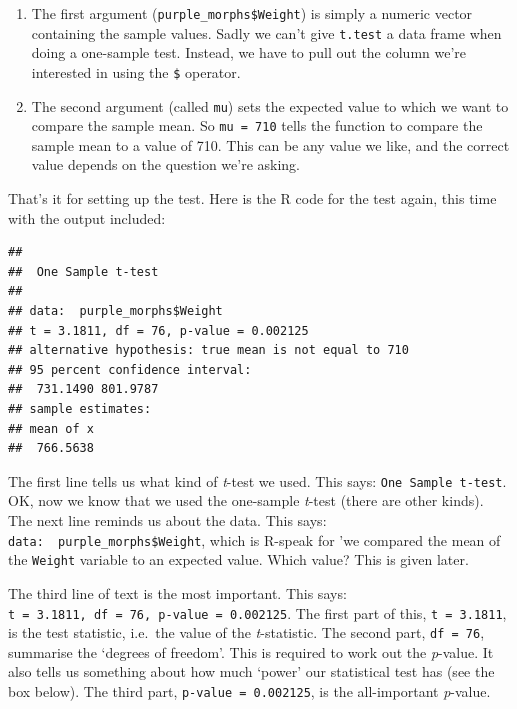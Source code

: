 \documentclass[
]{book}
\newenvironment{Shaded}{\begin{snugshade}}{\end{snugshade}}
\newcommand{\AttributeTok}[1]{\textcolor[rgb]{0.77,0.63,0.00}{#1}}
\newcommand{\DecValTok}[1]{\textcolor[rgb]{0.00,0.00,0.81}{#1}}
\newcommand{\FunctionTok}[1]{\textcolor[rgb]{0.00,0.00,0.00}{#1}}
\newcommand{\NormalTok}[1]{#1}
\newcommand{\SpecialCharTok}[1]{\textcolor[rgb]{0.00,0.00,0.00}{#1}}
\begin{document}
\begin{enumerate}
\def\labelenumi{\arabic{enumi}.}
\item
  The first argument (\texttt{purple\_morphs\$Weight}) is simply a numeric vector containing the sample values. Sadly we can't give \texttt{t.test} a data frame when doing a one-sample test. Instead, we have to pull out the column we're interested in using the \texttt{\$} operator.
\item
  The second argument (called \texttt{mu}) sets the expected value to which we want to compare the sample mean. So \texttt{mu\ =\ 710} tells the function to compare the sample mean to a value of 710. This can be any value we like, and the correct value depends on the question we're asking.
\end{enumerate}

That's it for setting up the test. Here is the R code for the test again, this time with the output included:

\begin{Shaded}
\end{Shaded}

\begin{verbatim}
## 
##  One Sample t-test
## 
## data:  purple_morphs$Weight
## t = 3.1811, df = 76, p-value = 0.002125
## alternative hypothesis: true mean is not equal to 710
## 95 percent confidence interval:
##  731.1490 801.9787
## sample estimates:
## mean of x 
##  766.5638
\end{verbatim}

The first line tells us what kind of \emph{t}-test we used. This says: \texttt{One\ Sample\ t-test}. OK, now we know that we used the one-sample \emph{t}-test (there are other kinds). The next line reminds us about the data. This says: \texttt{data:\ \ purple\_morphs\$Weight}, which is R-speak for 'we compared the mean of the \texttt{Weight} variable to an expected value. Which value? This is given later.

The third line of text is the most important. This says: \texttt{t\ =\ 3.1811,\ df\ =\ 76,\ p-value\ =\ 0.002125}. The first part of this, \texttt{t\ =\ 3.1811}, is the test statistic, i.e.~the value of the \emph{t}-statistic. The second part, \texttt{df\ =\ 76}, summarise the `degrees of freedom'. This is required to work out the \emph{p}-value. It also tells us something about how much `power' our statistical test has (see the box below). The third part, \texttt{p-value\ =\ 0.002125}, is the all-important \emph{p}-value.
\end{document}
